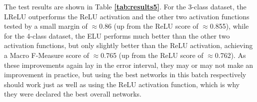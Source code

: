 The test results are shown in Table \textbf{\ref{tab:results5}}. For the 3-class dataset, the LReLU outperforms the ReLU activation and the other two activation functions tested by a small margin of $\approx$0.86 (up from the ReLU score of $\approx$0.855), while for the 4-class dataset, the ELU performs much better than the other two activation functions, but only slightly better than the ReLU activation, achieving a Macro F-Measure score of $\approx$0.765 (up from the ReLU score of $\approx$0.762). As these improvements again lay in the error interval, they may or may not make an improvement in practice, but using the best networks in this batch respectively should work just as well as using the ReLU activation function, which is why they were declared the best overall networks.\\

